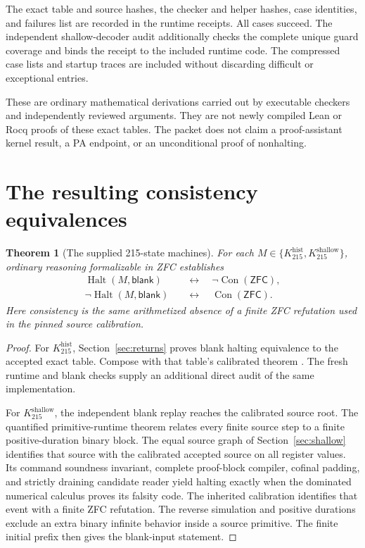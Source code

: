 \documentclass[11pt]{article}
\newtheorem{theorem}{Theorem}[section]
\theoremstyle{definition}
\newcommand{\ZFC}{\mathsf{ZFC}}
\newcommand{\Con}{\operatorname{Con}}
\newcommand{\Halt}{\operatorname{Halt}}
\newcommand{\blank}{\mathsf{blank}}
\newcommand{\Kctx}{K_{215}^{\mathrm{hist}}}
\newcommand{\Ksh}{K_{215}^{\mathrm{shallow}}}
\begin{document}
The exact table and source hashes, the checker and helper hashes, case
identities, and failures list are recorded in the runtime receipts. All
cases succeed. The independent shallow-decoder audit additionally checks
the complete unique guard coverage and binds the receipt to the included
runtime code. The compressed case lists and startup traces are included
without discarding difficult or exceptional entries.

These are ordinary mathematical derivations carried out by executable
checkers and independently reviewed arguments. They are not newly compiled
Lean or Rocq proofs of these exact tables. The packet does not claim a
proof-assistant kernel result, a PA endpoint, or an unconditional proof of
nonhalting.

\section{The resulting consistency equivalences}

\begin{theorem}[The supplied 215-state machines]
For each \(M\in\{\Kctx,\Ksh\}\), ordinary reasoning formalizable in ZFC
establishes
\begin{align*}
 \Halt(M,\blank)&\quad\longleftrightarrow\quad\neg\Con(\ZFC),\\
 \neg\Halt(M,\blank)&\quad\longleftrightarrow\quad\Con(\ZFC).
\end{align*}
Here consistency is the same arithmetized absence of a finite ZFC
refutation used in the pinned source calibration.
\end{theorem}
\begin{proof}
For \(\Kctx\), Section~\ref{sec:returns} proves blank halting equivalence
to the accepted exact table. Compose with that table's calibrated theorem
\cite{k215,calibration,dominated}. The fresh runtime and blank checks supply
an additional direct audit of the same implementation.

For \(\Ksh\), the independent blank replay reaches the calibrated source
root. The quantified primitive-runtime theorem relates every finite source
step to a finite positive-duration binary block. The equal source graph of
Section~\ref{sec:shallow} identifies that source with the calibrated
accepted source on all register values. Its command soundness invariant,
complete proof-block compiler, cofinal padding, and strictly draining
candidate reader yield halting exactly when the dominated numerical
calculus proves its falsity code. The inherited calibration identifies that
event with a finite ZFC refutation. The reverse simulation and positive
durations exclude an extra binary infinite behavior inside a source
primitive. The finite initial prefix then gives the blank-input statement.
\end{proof}
\end{document}
